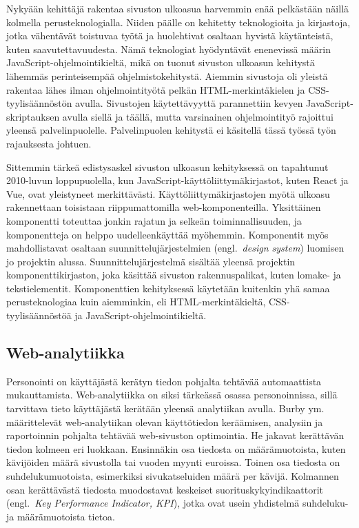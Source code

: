 \documentclass[finnish, 12pt, a4paper, elec, utf8, a-1b, online]{aaltothesis}
\begin{document}
Nykyään kehittäjä rakentaa sivuston ulkoasua harvemmin enää pelkästään näillä
kolmella perusteknologialla. Niiden päälle on kehitetty teknologioita ja
kirjastoja, jotka vähentävät toistuvaa työtä ja huolehtivat osaltaan hyvistä
käytänteistä, kuten saavutettavuudesta. Nämä teknologiat hyödyntävät enenevissä
määrin JavaScript-ohjelmointikieltä, mikä on tuonut sivuston ulkoasun kehitystä
lähemmäs perinteisempää ohjelmistokehitystä. Aiemmin sivustoja oli yleistä
rakentaa lähes ilman ohjelmointityötä pelkän HTML-merkintäkielen ja
CSS-tyylisäännöstön avulla. Sivustojen käytettävyyttä parannettiin kevyen
JavaScript-skriptauksen avulla siellä ja täällä, mutta varsinainen
ohjelmointityö rajoittui yleensä palvelinpuolelle. Palvelinpuolen kehitystä ei
käsitellä tässä työssä työn rajauksesta johtuen.

Sittemmin tärkeä edistysaskel sivuston ulkoasun kehityksessä on tapahtunut
2010-luvun loppupuolella, kun JavaScript-käyttöliittymäkirjastot, kuten React ja
Vue, ovat yleistyneet merkittävästi. Käyttöliittymäkirjastojen myötä ulkoasu
rakennettaan toisistaan riippumattomilla web-komponenteilla. Yksittäinen
komponentti toteuttaa jonkin rajatun ja selkeän toiminnallisuuden, ja
komponentteja on helppo uudelleenkäyttää myöhemmin. Komponentit myös
mahdollistavat osaltaan suunnittelujärjestelmien (engl.~\textit{design system})
luomisen jo projektin alussa. Suunnittelujärjestelmä sisältää yleensä projektin
komponenttikirjaston, joka käsittää sivuston rakennuspalikat, kuten lomake- ja
tekstielementit. Komponenttien kehityksessä käytetään kuitenkin yhä samaa
perusteknologiaa kuin aiemminkin, eli HTML-merkintäkieltä, CSS-tyylisäännöstöä
ja JavaScript-ohjelmointikieltä.

\subsection{Web-analytiikka}

Personointi on käyttäjästä kerätyn tiedon pohjalta tehtävää automaattista
mukauttamista. Web-analytiikka on siksi tärkeässä osassa personoinnissa, sillä
tarvittava tieto käyttäjästä kerätään yleensä analytiikan avulla. Burby
ym.~\cite{burby2007web} määrittelevät web-analytiikan olevan käyttötiedon
keräämisen, analysiin ja raportoinnin pohjalta tehtävää web-sivuston
optimointia. He jakavat kerättävän tiedon kolmeen eri luokkaan. Ensinnäkin osa
tiedosta on määrämuotoista, kuten kävijöiden määrä sivustolla tai vuoden myynti
euroissa. Toinen osa tiedosta on suhdelukumuotoista, esimerkiksi sivukatseluiden
määrä per kävijä. Kolmannen osan kerättävästä tiedosta muodostavat keskeiset
suorituskykyindikaattorit (engl.~\textit{Key Performance Indicator, KPI}), jotka
ovat usein yhdistelmä suhdeluku- ja määrämuotoista tietoa.
\end{document}
